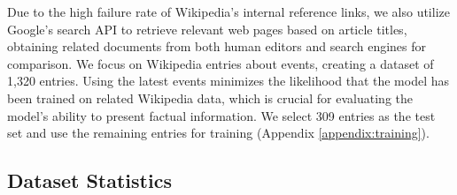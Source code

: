 \documentclass[11pt]{article}
\newcommand{\bench}{\textsc{WikiGenBench}}
\begin{document}
Due to the high failure rate of Wikipedia’s internal reference links, we also utilize Google's search API to retrieve relevant web pages based on article titles, obtaining related documents from both human editors and search engines for comparison. We focus on Wikipedia entries about events, creating a dataset of 1,320 entries. Using the latest events minimizes the likelihood that the model has been trained on related Wikipedia data, which is crucial for evaluating the model's ability to present factual information. We select 309 entries as the test set and use the remaining entries for training (Appendix \ref{appendix:training}).
\subsection{Dataset Statistics}
\begin{table}[t]
\centering
{}
\caption{Statistics of \bench{} dataset. We report the scale of Wikipedia reference articles and related documents.}
\label{tab:dataset_characteristics_overview}
\end{table}
\end{document}
